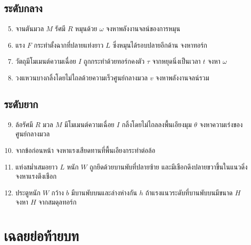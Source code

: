 \subsection*{ระดับกลาง}

\begin{enumerate}
    \setcounter{enumi}{4}
    \item จานตันมวล $M$ รัศมี $R$ หมุนด้วย $\omega$ จงหาพลังงานจลน์ของการหมุน
    \item แรง $F$ กระทำตั้งฉากที่ปลายแท่งยาว $L$ ซึ่งหมุนได้รอบปลายอีกด้าน จงหาทอร์ก
    \item วัตถุมีโมเมนต์ความเฉื่อย $I$ ถูกกระทำด้วยทอร์กคงตัว $\tau$ จากหยุดนิ่งเป็นเวลา $t$ จงหา $\omega$
    \item วงแหวนบางกลิ้งโดยไม่ไถลด้วยความเร็วศูนย์กลางมวล $v$ จงหาพลังงานจลน์รวม
\end{enumerate}

\subsection*{ระดับยาก}

\begin{enumerate}
    \setcounter{enumi}{8}
    \item ล้อรัศมี $R$ มวล $M$ มีโมเมนต์ความเฉื่อย $I$ กลิ้งโดยไม่ไถลลงพื้นเอียงมุม $\theta$ จงหาความเร่งของศูนย์กลางมวล
    \item จากข้อก่อนหน้า จงหาแรงเสียดทานที่พื้นเอียงกระทำต่อล้อ
    \item แท่งสม่ำเสมอยาว $L$ หนัก $W$ ถูกยึดด้วยบานพับที่ปลายซ้าย และมีเชือกดึงปลายขวาขึ้นในแนวดิ่ง จงหาแรงตึงเชือก
    \item ประตูหนัก $W$ กว้าง $b$ มีบานพับบนและล่างห่างกัน $h$ ถ้าแรงแนวระดับที่บานพับบนมีขนาด $H$ จงหา $H$ จากสมดุลทอร์ก
\end{enumerate}

\section{เฉลยย่อท้ายบท}

